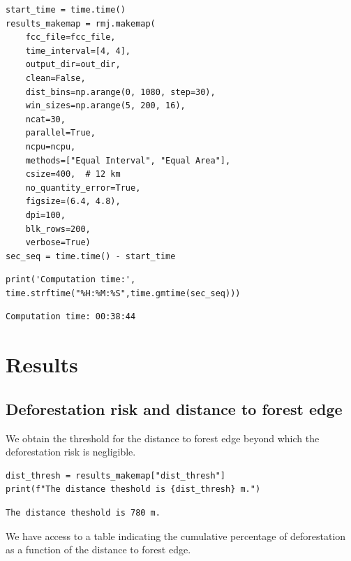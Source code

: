 \documentclass[paper=a4, 12pt, DIV=12]{scrartcl}
\begin{document}
\begin{verbatim}
start_time = time.time()
results_makemap = rmj.makemap(
    fcc_file=fcc_file,
    time_interval=[4, 4],
    output_dir=out_dir,
    clean=False,
    dist_bins=np.arange(0, 1080, step=30),
    win_sizes=np.arange(5, 200, 16),
    ncat=30,
    parallel=True,
    ncpu=ncpu,
    methods=["Equal Interval", "Equal Area"],
    csize=400,  # 12 km
    no_quantity_error=True,
    figsize=(6.4, 4.8),
    dpi=100,
    blk_rows=200,
    verbose=True)
sec_seq = time.time() - start_time
\end{verbatim}

\begin{verbatim}
print('Computation time:', time.strftime("%H:%M:%S",time.gmtime(sec_seq)))
\end{verbatim}

\begin{verbatim}
Computation time: 00:38:44
\end{verbatim}

\section{Results}
\label{sec:orgcaa4918}

\subsection{Deforestation risk and distance to forest edge}
\label{sec:orgfd3040e}

We obtain the threshold for the distance to forest edge beyond which the deforestation risk is negligible.

\begin{verbatim}
dist_thresh = results_makemap["dist_thresh"]
print(f"The distance theshold is {dist_thresh} m.")
\end{verbatim}

\begin{verbatim}
The distance theshold is 780 m.
\end{verbatim}


We have access to a table indicating the cumulative percentage of deforestation as a function of the distance to forest edge.
\end{document}
